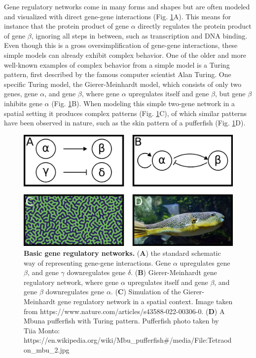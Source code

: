 Gene regulatory networks come in many forms and shapes but are often modeled and visualized with direct gene-gene interactions (Fig. \ref{fig:network}A). This means for instance that the protein product of gene $\alpha$ directly regulates the protein product of gene $\beta$, ignoring all steps in between, such as transcription and DNA binding. Even though this is a gross oversimplification of gene-gene interactions, these simple models can already exhibit complex behavior. One of the older and more well-known examples of complex behavior from a simple model is a Turing pattern, first described by the famous computer scientist Alan Turing\cite{Turing1952}. One specific Turing model, the Gierer-Meinhardt model, which consists of only two genes, gene $\alpha$, and gene $\beta$, where gene $\alpha$ upregulates itself and gene $\beta$, but gene $\beta$ inhibits gene $\alpha$ (Fig. \ref{fig:network}B). When modeling this simple two-gene network in a spatial setting it produces complex patterns (Fig. \ref{fig:network}C), of which similar patterns have been observed in nature, such as the skin pattern of a pufferfish (Fig. \ref{fig:network}D).

\begin{figure}[H]
    \center
    \includegraphics[width=0.8\linewidth]{ch.introduction/imgs/network.png}
    \caption{\textbf{Basic gene regulatory networks.} (\textbf{A}) the standard schematic way of representing gene-gene interactions. Gene $\alpha$ upregulates gene $\beta$, and gene $\gamma$ downregulates gene $\delta$. (\textbf{B}) Gierer-Meinhardt gene regulatory network, where gene $\alpha$ upregulates itself and gene $\beta$, and gene $\beta$ downregulates gene $\alpha$. (\textbf{C}) Simulation of the Gierer-Meinhardt gene regulatory network in a spatial context. Image taken from https://www.nature.com/articles/s43588-022-00306-0. (\textbf{D}) A Mbuna pufferfish with Turing pattern. Pufferfish photo taken by Tiia Monto: https://en.wikipedia.org/wiki/Mbu\_pufferfish\#/media/File:Tetraodon\_mbu\_2.jpg}
    \label{fig:network}
\end{figure}


